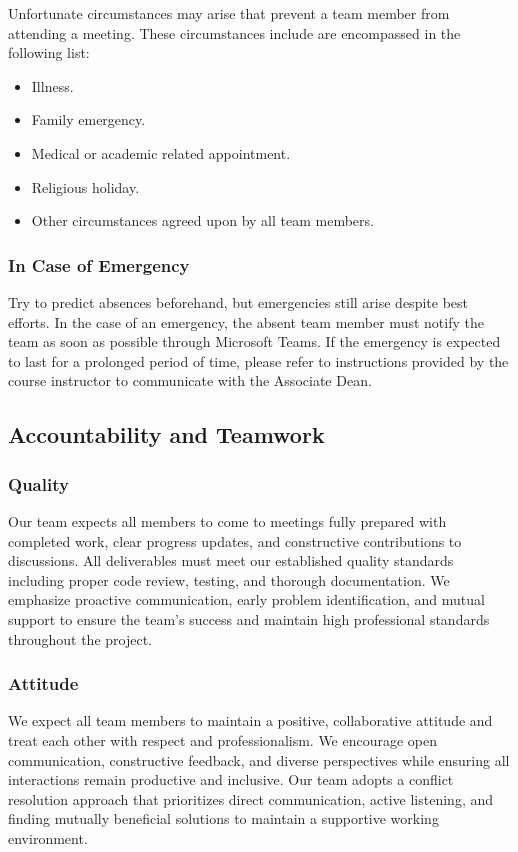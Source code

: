 \documentclass{article}
\begin{document}
Unfortunate circumstances may arise that prevent a team member from attending a meeting.
These circumstances include are encompassed in the following list:
\begin{itemize}
  \item Illness.
  \item Family emergency.
  \item Medical or academic related appointment.
  \item Religious holiday.
  \item Other circumstances agreed upon by all team members.
\end{itemize}

\subsubsection*{In Case of Emergency}

Try to predict absences beforehand, but emergencies still arise despite best efforts.
In the case of an emergency, the absent team member must notify the team as soon as possible through Microsoft Teams.
If the emergency is expected to last for a prolonged period of time, please refer to instructions provided by the course instructor 
to communicate with the Associate Dean.

\subsection*{Accountability and Teamwork}

\subsubsection*{Quality} 

Our team expects all members to come to meetings fully prepared with completed work, 
clear progress updates, and constructive contributions to discussions.
All deliverables must meet our established quality standards including proper code review, testing, and thorough documentation. 
We emphasize proactive communication, early problem identification, and mutual support to ensure the team's success and maintain high 
professional standards throughout the project.

\subsubsection*{Attitude}

We expect all team members to maintain a positive, collaborative attitude and treat each other with respect and professionalism. 
We encourage open communication, constructive feedback, and diverse perspectives while ensuring all interactions remain productive and inclusive. 
Our team adopts a conflict resolution approach that prioritizes direct communication, active listening, and finding mutually beneficial solutions to 
maintain a supportive working environment.
\end{document}
